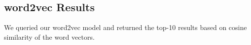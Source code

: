 \documentclass{article} %
\begin{document}
\subsection{word2vec Results}
We queried our word2vec model and returned the top-10 results based on cosine similarity of the word vectors.




%
%
\end{document}
